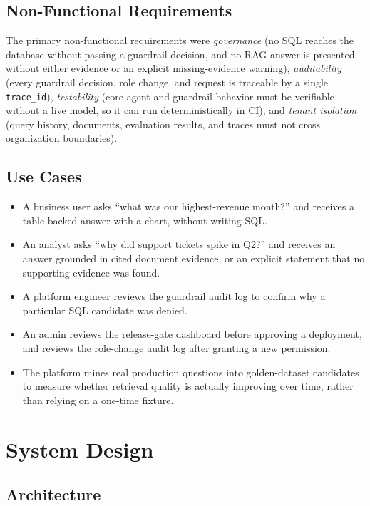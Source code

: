 \documentclass[conference]{IEEEtran}
\begin{document}
\subsection{Non-Functional Requirements}
The primary non-functional requirements were \emph{governance} (no SQL
reaches the database without passing a guardrail decision, and no RAG
answer is presented without either evidence or an explicit
missing-evidence warning), \emph{auditability} (every guardrail decision,
role change, and request is traceable by a single \texttt{trace\_id}),
\emph{testability} (core agent and guardrail behavior must be verifiable
without a live model, so it can run deterministically in CI), and
\emph{tenant isolation} (query history, documents, evaluation results, and
traces must not cross organization boundaries).

\subsection{Use Cases}
\begin{itemize}
    \item A business user asks ``what was our highest-revenue month?'' and
    receives a table-backed answer with a chart, without writing SQL.
    \item An analyst asks ``why did support tickets spike in Q2?'' and
    receives an answer grounded in cited document evidence, or an explicit
    statement that no supporting evidence was found.
    \item A platform engineer reviews the guardrail audit log to confirm
    why a particular SQL candidate was denied.
    \item An admin reviews the release-gate dashboard before approving a
    deployment, and reviews the role-change audit log after granting a new
    permission.
    \item The platform mines real production questions into golden-dataset
    candidates to measure whether retrieval quality is actually improving
    over time, rather than relying on a one-time fixture.
\end{itemize}

\section{System Design}

\subsection{Architecture}
\end{document}
